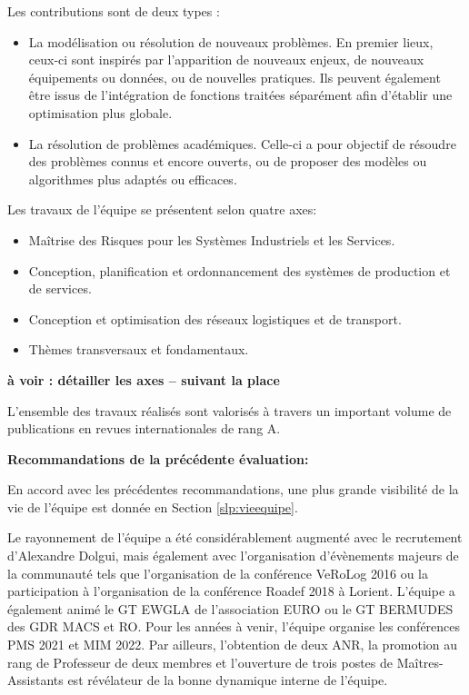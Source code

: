 Les contributions sont de deux types : 
\begin{itemize}
\item La modélisation ou résolution de nouveaux problèmes. En premier lieux, ceux-ci sont  inspirés par l'apparition de nouveaux enjeux, de nouveaux équipements ou données, ou de nouvelles pratiques. 
Ils peuvent également être issus de l'intégration de fonctions traitées séparément afin d'établir une optimisation plus globale. 
\item La résolution de problèmes académiques. Celle-ci a pour objectif de résoudre des problèmes connus et encore ouverts, ou de proposer des modèles ou algorithmes plus adaptés ou efficaces.
\end{itemize}

Les travaux de l'équipe se présentent selon quatre axes:
\begin{itemize}
    \item Maîtrise des Risques pour les Systèmes Industriels et les Services.
    \item Conception, planification et ordonnancement des systèmes de production et de services.
    \item Conception et optimisation des réseaux logistiques et de transport.
    \item Thèmes transversaux et fondamentaux.
\end{itemize}

\textbf{à voir : détailler les axes -- suivant la place}

L'ensemble des travaux réalisés sont valorisés à travers un important volume de publications en revues internationales de rang A.


\textbf{Recommandations de la précédente évaluation:}

En accord avec les précédentes recommandations, une plus grande visibilité de la vie de l'équipe est donnée en Section \ref{slp:vieequipe}.

Le rayonnement de l'équipe a été considérablement augmenté avec le recrutement d'Alexandre Dolgui, mais également avec l'organisation d'évènements majeurs de la communauté tels que l'organisation de la conférence VeRoLog 2016 ou la participation à l'organisation de la conférence Roadef 2018 à Lorient. 
L'équipe a également animé le GT EWGLA de l'association EURO ou le GT BERMUDES des GDR MACS et RO.
Pour les années à venir, l'équipe organise les conférences PMS 2021 et MIM 2022.
Par ailleurs, l'obtention de deux ANR, la promotion au rang de Professeur de deux membres et l'ouverture de trois postes de Maîtres-Assistants est révélateur de la bonne dynamique interne de l'équipe.

